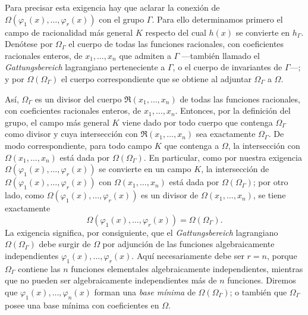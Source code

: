 Para precisar esta exigencia hay que aclarar la conexión de $\Omega(\varphi_1(x),\ldots,\varphi_r(x))$ con el grupo $\Gamma$. Para ello determinamos primero el campo de racionalidad más general $K$ respecto del cual $h(x)$ se convierte en $h_\Gamma$. Denótese por $\Omega_\Gamma$ el cuerpo de todas las funciones racionales, con coeficientes racionales enteros, de $x_1,
\ldots,x_n$ que admiten a $\Gamma$ ---también llamado el \emph{Gattungsbereich} lagrangiano perteneciente a $\Gamma$, o el cuerpo de invariantes de $\Gamma$---; y por $\Omega(\Omega_\Gamma)$ el cuerpo correspondiente que se obtiene al adjuntar $\Omega_\Gamma$ a $\Omega$.

Así, $\Omega_\Gamma$ es un divisor del cuerpo $\mathfrak R(x_1,
\ldots,x_n)$ de todas las funciones racionales, con coeficientes racionales enteros, de $x_1,
\ldots,x_n$. Entonces, por la definición del grupo, el campo más general $K$ viene dado por todo cuerpo que contenga $\Omega_\Gamma$ como divisor y cuya intersección con $\mathfrak R(x_1,
\ldots,x_n)$ sea exactamente $\Omega_\Gamma$. De modo correspondiente, para todo campo $K$ que contenga a $\Omega$, la intersección con $\Omega(x_1,
\ldots,x_n)$ está dada por $\Omega(\Omega_\Gamma)$. En particular, como por nuestra exigencia $\Omega(\varphi_1(x),\ldots,\varphi_r(x))$ se convierte en un campo $K$, la intersección de $\Omega(\varphi_1(x),\ldots,\varphi_r(x))$ con $\Omega(x_1,
\ldots,x_n)$ está dada por $\Omega(\Omega_\Gamma)$; por otro lado, como $\Omega(\varphi_1(x),\ldots,\varphi_r(x))$ es un divisor de $\Omega(x_1,
\ldots,x_n)$, se tiene exactamente
\[
\Omega(\varphi_1(x),\ldots,\varphi_r(x))=\Omega(\Omega_\Gamma).
\]
La exigencia significa, por consiguiente, que el \emph{Gattungsbereich} lagrangiano $\Omega(\Omega_\Gamma)$ debe surgir de $\Omega$ por adjunción de las funciones algebraicamente independientes $\varphi_1(x),\ldots,\varphi_r(x)$. Aquí necesariamente debe ser $r=n$, porque $\Omega_\Gamma$ contiene las $n$ funciones elementales algebraicamente independientes, mientras que no pueden ser algebraicamente independientes más de $n$ funciones. Diremos que $\varphi_1(x),\ldots,\varphi_n(x)$ forman una \emph{base mínima} de $\Omega(\Omega_\Gamma)$; o también que $\Omega_\Gamma$ posee una base mínima con coeficientes en $\Omega$.

